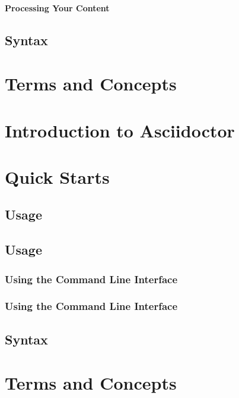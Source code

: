 \paragraph{Processing Your Content}
\hypertarget{_processing_your_content}{}
\subsection{Syntax}
\hypertarget{_syntax}{}
\section{Terms and Concepts}
\hypertarget{_terms_and_concepts}{}

\section{Introduction to Asciidoctor}
\hypertarget{_introduction_to_asciidoctor}{}
\section{Quick Starts}
\hypertarget{_quick_starts}{\subsection{Usage}}
\subsection{Usage}
\hypertarget{_usage}{\subsubsection{Using the Command Line Interface}}
\subsubsection{Using the Command Line Interface}
\hypertarget{_using_the_command_line_interface}{}
\subsection{Syntax}
\hypertarget{_syntax}{}
\section{Terms and Concepts}
\hypertarget{_terms_and_concepts}{}

